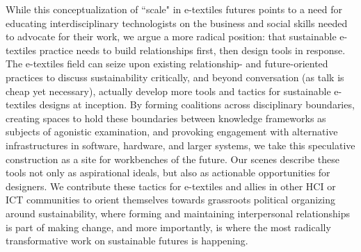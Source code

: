 While this conceptualization of ``scale" in e-textiles futures points to a need for educating interdisciplinary technologists on the business and social skills needed to advocate for their work, we argue a more radical position: that sustainable e-textiles practice needs to build relationships first, then design tools in response. The e-textiles field can seize upon existing relationship- and future-oriented practices to discuss sustainability critically, and beyond conversation (as talk is cheap yet necessary), actually develop more tools and tactics for sustainable e-textiles designs at inception. By forming coalitions across disciplinary boundaries, creating spaces to hold these boundaries between knowledge frameworks as subjects of agonistic examination, and provoking engagement with alternative infrastructures in software, hardware, and larger systems, we take this speculative construction as a site for  workbenches of the future. Our scenes describe these tools not only as aspirational ideals, but also as actionable opportunities for designers.
We contribute these tactics for e-textiles and allies in other HCI or ICT communities to orient themselves towards grassroots political organizing around sustainability, where forming and maintaining interpersonal relationships is part of making change, and more importantly, is where the most radically transformative work on sustainable futures is happening.

